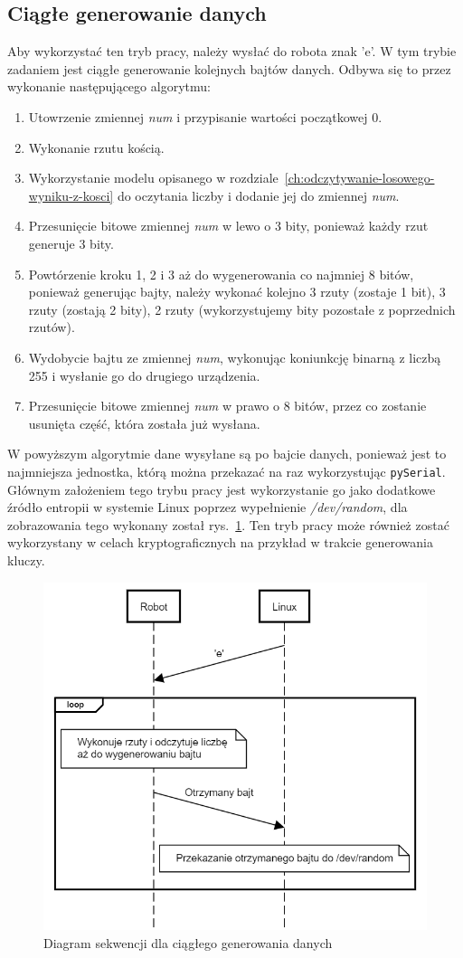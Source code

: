 \subsection{Ciągłe generowanie danych}
Aby wykorzystać ten tryb pracy, należy wysłać do robota znak 'e'.
W tym trybie zadaniem jest ciągłe generowanie kolejnych bajtów danych.
Odbywa się to przez wykonanie następującego algorytmu:
\begin{enumerate}
    \item Utowrzenie zmiennej \textit{num} i przypisanie wartości początkowej 0.
    \item Wykonanie rzutu kością.
    \item Wykorzystanie modelu opisanego w rozdziale~\ref{ch:odczytywanie-losowego-wyniku-z-kosci} do oczytania liczby i dodanie jej do zmiennej \textit{num}.
    \item Przesunięcie bitowe zmiennej \textit{num} w lewo o 3 bity, ponieważ każdy rzut generuje 3 bity.
    \item Powtórzenie kroku 1, 2 i 3 aż do wygenerowania co najmniej 8 bitów, ponieważ generując bajty, należy wykonać
    kolejno 3 rzuty (zostaje 1 bit), 3 rzuty (zostają 2 bity), 2 rzuty (wykorzystujemy bity pozostałe z poprzednich rzutów).
    \item Wydobycie bajtu ze zmiennej \textit{num}, wykonując koniunkcję binarną z liczbą 255 i wysłanie go do drugiego urządzenia.
    \item Przesunięcie bitowe zmiennej \textit{num} w prawo o 8 bitów, przez co zostanie usunięta część, która została już wysłana.
\end{enumerate}

W powyższym algorytmie dane wysyłane są po bajcie danych, ponieważ jest to najmniejsza jednostka, 
którą można przekazać na raz wykorzystując \texttt{pySerial}.
Głównym założeniem tego trybu pracy jest wykorzystanie go jako dodatkowe źródło entropii w systemie 
Linux poprzez wypełnienie \textit{/dev/random}, dla zobrazowania tego wykonany został rys.~\ref{fig:interface_a}. 
Ten tryb pracy może również zostać wykorzystany w celach 
kryptograficznych na przykład w trakcie generowania kluczy.

\begin{figure}[H]
    \centering
    \includegraphics[width=0.5\linewidth]{chapters/05-Przetwarzanie Wyniku/figures/InterfaceA}
    \caption{Diagram sekwencji dla ciągłego generowania danych}
    \label{fig:interface_a}
\end{figure}

